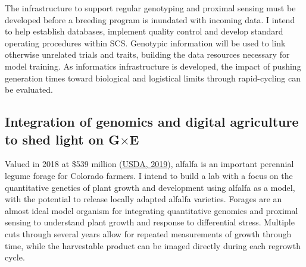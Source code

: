 \documentclass[11pt]{article}
\newcommand{\gxe}{G$\times$E}
\begin{document}


The infrastructure to support regular genotyping and proximal sensing must be developed before a breeding program is inundated with incoming data. I intend to help establish databases, implement quality control and develop standard operating procedures within SCS. Genotypic information will be used to link otherwise unrelated trials and traits, building the data resources necessary for model training. As informatics infrastructure is developed, the impact of pushing generation times toward biological and logistical limits through rapid-cycling can be evaluated. 

\subsection*{Integration of genomics and digital agriculture to shed light on \gxe}


Valued in 2018 at \$539 million (\href{https://www.nass.usda.gov/Quick_Stats/Ag_Overview/stateOverview.php?state=COLORADO}{USDA, 2019}), alfalfa is an important perennial legume forage for Colorado farmers. I intend to build a lab with a focus on the quantitative genetics of plant growth and development using alfalfa as a model, with the potential to release locally adapted alfalfa varieties. Forages are an almost ideal model organism for integrating quantitative genomics and proximal sensing to understand plant growth and response to differential stress. Multiple cuts through several years allow for repeated measurements of growth through time, while the harvestable product can be imaged directly during each regrowth cycle. 


\end{document}
